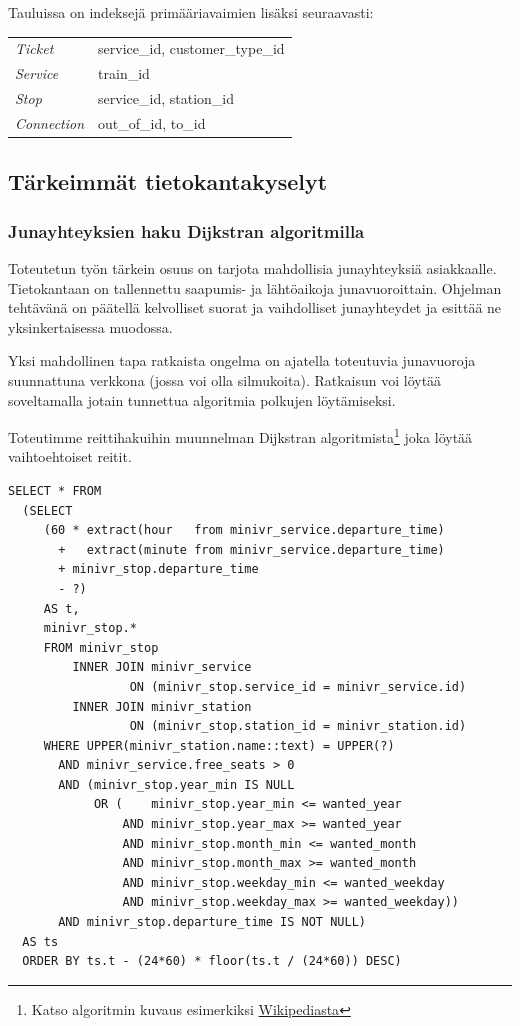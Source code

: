 \documentclass[a4paper,twoside,titlepage,12pt]{article}
\begin{document}
Tauluissa on indeksejä primääriavaimien lisäksi seuraavasti:

\begin{tabular}{ll}
\emph{Ticket} & service\_id, customer\_type\_id\\
\emph{Service} & train\_id\\
\emph{Stop} & service\_id, station\_id\\
\emph{Connection} & out\_of\_id, to\_id\\
\end{tabular}

\subsection{Tärkeimmät tietokantakyselyt}

\subsubsection{Junayhteyksien haku Dĳkstran algoritmilla}
Toteutetun työn tärkein osuus on tarjota mahdollisia junayhteyksiä asiakkaalle. Tietokantaan on tallennettu saapumis- ja lähtöaikoja junavuoroittain. Ohjelman tehtävänä on päätellä kelvolliset suorat ja vaihdolliset junayhteydet ja esittää ne yksinkertaisessa muodossa.

Yksi mahdollinen tapa ratkaista ongelma on ajatella toteutuvia junavuoroja suunnattuna verkkona (jossa voi olla silmukoita). Ratkaisun voi löytää soveltamalla jotain tunnettua algoritmia polkujen löytämiseksi.

Toteutimme reittihakuihin muunnelman Dĳkstran algoritmista\footnote{Katso algoritmin kuvaus esimerkiksi \href{http://fi.wikipedia/Dijkstran\_algoritmi}{Wikipediasta}} joka löytää vaihtoehtoiset reitit.

\lstset{language=SQL,caption=Esimerkki kyselylauseesta}
\begin{lstlisting}
SELECT * FROM
  (SELECT
     (60 * extract(hour   from minivr_service.departure_time)
       +   extract(minute from minivr_service.departure_time)
       + minivr_stop.departure_time
       - ?)
     AS t,
     minivr_stop.*
     FROM minivr_stop
         INNER JOIN minivr_service
                 ON (minivr_stop.service_id = minivr_service.id)
         INNER JOIN minivr_station
                 ON (minivr_stop.station_id = minivr_station.id)
     WHERE UPPER(minivr_station.name::text) = UPPER(?)
       AND minivr_service.free_seats > 0
       AND (minivr_stop.year_min IS NULL
            OR (    minivr_stop.year_min <= wanted_year
                AND minivr_stop.year_max >= wanted_year
                AND minivr_stop.month_min <= wanted_month
                AND minivr_stop.month_max >= wanted_month
                AND minivr_stop.weekday_min <= wanted_weekday
                AND minivr_stop.weekday_max >= wanted_weekday))
       AND minivr_stop.departure_time IS NOT NULL)
  AS ts
  ORDER BY ts.t - (24*60) * floor(ts.t / (24*60)) DESC)
\end{lstlisting}
\end{document}
